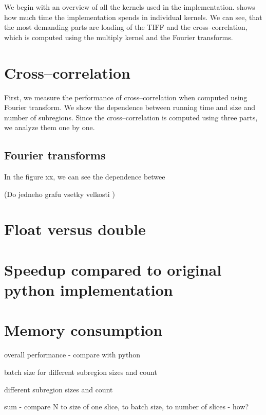 We begin with an overview of all the kernels used in the implementation.  shows how much time the implementation spends in individual kernels. We can see, that the most demanding parts are loading of the TIFF and the cross--correlation, which is computed using the multiply kernel and the Fourier transforms. 

\section{Cross--correlation}
First, we measure the performance of cross--correlation when computed using Fourier transform. We show the dependence between running time and size and number of subregions. Since the cross--correlation is computed using three parts, we analyze them one by one.


\subsection{Fourier transforms}
In the figure xx, we can see the dependence betwee

(Do jedneho grafu vsetky velkosti )


\section{Float versus double}




\section{Speedup compared to original python implementation}

\section{Memory consumption}

overall performance - compare with python

batch size for different subregion sizes and count

different subregion sizes and count

sum - compare N to size of one slice, to batch size, to number of slices - how?